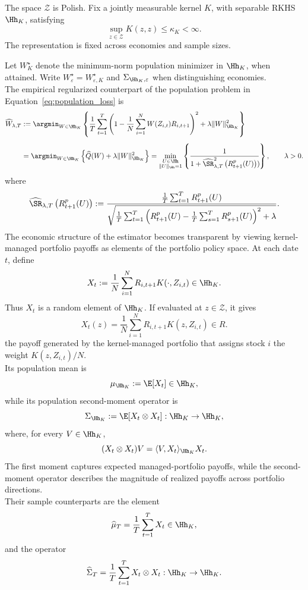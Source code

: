 \begin{assumption}
\label{ass:kernel}
The space $\mathscr Z$ is Polish. Fix a jointly measurable kernel $K$,
with separable RKHS $\Hh_K$, satisfying
\[
\sup_{z\in\mathscr Z}K(z,z)\leq\kappa_K<\infty.
\]
The representation is fixed across economies and sample sizes.
\end{assumption}
Let $W_K^\star$ denote the minimum-norm population minimizer in $\Hh_K$,
when attained. Write $W^\star_\varepsilon=W^\star_{\varepsilon,K}$ and
$\Sigma_{\Hh_K,\varepsilon}$ when distinguishing economies.\\
The empirical regularized counterpart of
the population problem in Equation~\eqref{eq:population_loss} is
\begin{equation}
\begin{aligned}
\widehat W_{\lambda,T}
&:=
\argmin_{W\in\Hh_K}
\left\{
\frac1T\sum_{t=1}^T
\left(
1-\frac1N\sum_{i=1}^N
W(Z_{i,t})R_{i,t+1}
\right)^2
+
\lambda\|W\|_{\Hh_K}^2
\right\}
\\[0.5em]
&=
\argmin_{W\in\Hh_K}
\left\{
\widehat Q(W)
+
\lambda\|W\|_{\Hh_K}^2
\right\}
=
\min_{\substack{U\in\Hh\\ \|U\|_{\Hh}=1}}
\left\{
\frac{1}{
1+\widehat{\SR}^2_{\lambda,T}
\left(R^p_{t+1}(U)\right))\!
}
\right\},
\qquad \lambda>0.
\end{aligned}
\label{eq:estimator}
\end{equation}
where
\[
\widehat{\SR}_{\lambda,T}
\left(R^p_{t+1}(U)\right)
:=
\frac{
\frac1T
\sum_{t=1}^T
R^p_{t+1}(U)
}{
\sqrt{
\frac1T
\sum_{t=1}^T
\left(
R^p_{t+1}(U)
-
\frac1T
\sum_{s=1}^T
R^p_{s+1}(U)
\right)^2
+\lambda
}
}.
\]
The economic structure of the estimator becomes transparent by viewing
kernel-managed portfolio payoffs as elements of the portfolio policy space.
At each date $t$, define
\[
X_t
:=
\frac{1}{N}
\sum_{i=1}^{N}
R_{i,t+1}K(\cdot,Z_{i,t})
\in\Hh_K.
\]
Thus $X_t$ is a random element of $\Hh_K$. If evaluated at
$z\in\mathscr Z$, it gives
\[
X_t(z)
=
\frac{1}{N}
\sum_{i=1}^{N}
R_{i,t+1}K(z,Z_{i,t}) \in R.
\]
the payoff generated by the kernel-managed portfolio that assigns stock $i$
the weight $K(z,Z_{i,t})/N$.\\
Its population mean is
\[
\mu_{\Hh_K}
:=
\E[X_t]
\in\Hh_K,
\]
while its population second-moment operator is
\[
\Sigma_{\Hh_K}
:=
\E[X_t\otimes X_t]
:
\Hh_K\rightarrow\Hh_K,
\]
where, for every $V\in\Hh_K$,
\[
(X_t\otimes X_t)V
=
\langle V,X_t\rangle_{\Hh_K}X_t.
\]
The first moment captures expected managed-portfolio payoffs, while the
second-moment operator describes the magnitude of realized payoffs across
portfolio directions.\\
Their sample counterparts are the element
\[
\widehat\mu_T
=
\frac{1}{T}\sum_{t=1}^{T}X_t
\in\Hh_K,
\]
and the operator
\[
\widehat\Sigma_T
=
\frac{1}{T}\sum_{t=1}^{T}X_t\otimes X_t
:
\Hh_K\rightarrow\Hh_K.
\]

